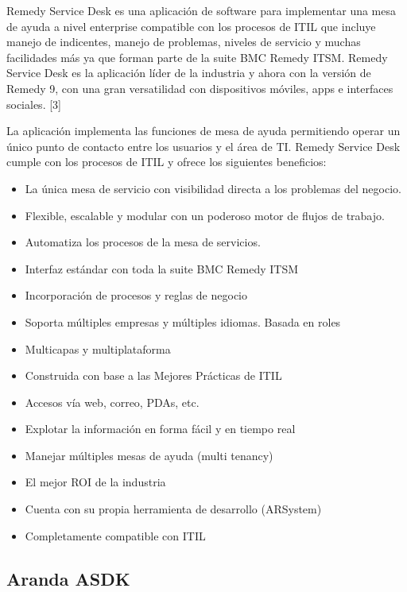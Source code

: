 Remedy Service Desk es una aplicación de software para implementar una mesa de ayuda a nivel enterprise compatible con los procesos de ITIL que incluye manejo de indicentes, manejo de problemas, niveles de servicio y muchas facilidades más ya que forman parte de la suite BMC Remedy ITSM. Remedy Service Desk es la aplicación líder de la industria y ahora con la versión de Remedy 9, con una gran versatilidad con dispositivos móviles, apps e interfaces sociales. [3]

La aplicación implementa las funciones de mesa de ayuda permitiendo operar un único punto de contacto entre los usuarios y el área de TI. Remedy Service Desk cumple con los procesos de ITIL y ofrece los siguientes beneficios:

\begin{itemize}	
\item	La única mesa de servicio con visibilidad directa a los problemas del negocio.
\item	Flexible, escalable y modular con un poderoso motor de flujos de trabajo.
\item	Automatiza los procesos de la mesa de servicios.
\item	Interfaz estándar con toda la suite BMC Remedy ITSM
\item	Incorporación de procesos y reglas de negocio
\item	Soporta múltiples empresas y múltiples idiomas.
	Basada en roles
\item	Multicapas y multiplataforma
\item	Construida con base a las Mejores Prácticas de ITIL
\item	Accesos vía web, correo, PDAs, etc.
\item	Explotar la información en forma fácil y en tiempo real
\item	Manejar múltiples mesas de ayuda (multi tenancy)
\item	El mejor ROI de la industria
\item	Cuenta con su propia herramienta de desarrollo (ARSystem)
\item	Completamente compatible con ITIL
	
\end{itemize}

 \subsection{Aranda ASDK}
 
